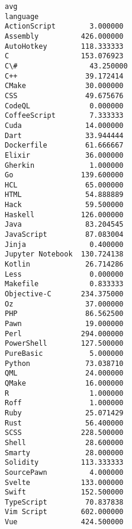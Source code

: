 \documentclass[11pt]{article}
\makeatletter
\newcommand{\boxspacing}{\kern\kvtcb@left@rule\kern\kvtcb@boxsep}
\newcommand{\prompt}[4]{
        {\ttfamily\llap{{\color{#2}[#3]:\hspace{3pt}#4}}\vspace{-\baselineskip}}
    }
\makeatother
\begin{document}
            \begin{tcolorbox}[breakable, size=fbox, boxrule=.5pt, pad at break*=1mm, opacityfill=0]
\prompt{Out}{outcolor}{13}{\boxspacing}
\begin{Verbatim}[commandchars=\\\{\}]
                         avg
language
ActionScript        3.000000
Assembly          426.000000
AutoHotkey        118.333333
C                 153.076923
C\#                 43.250000
C++                39.172414
CMake              30.000000
CSS                49.675676
CodeQL              0.000000
CoffeeScript        7.333333
Cuda               14.000000
Dart               33.944444
Dockerfile         61.666667
Elixir             36.000000
Gherkin             1.000000
Go                139.600000
HCL                65.000000
HTML               54.888889
Hack               59.500000
Haskell           126.000000
Java               83.204545
JavaScript         87.083004
Jinja               0.400000
Jupyter Notebook  130.724138
Kotlin             26.714286
Less                0.000000
Makefile            0.833333
Objective-C       234.375000
Oz                 37.000000
PHP                86.562500
Pawn               19.000000
Perl              294.000000
PowerShell        127.500000
PureBasic           5.000000
Python             73.038710
QML                24.000000
QMake              16.000000
R                   1.000000
Roff                1.000000
Ruby               25.071429
Rust               56.400000
SCSS              228.500000
Shell              28.600000
Smarty             28.000000
Solidity          113.333333
SourcePawn          4.000000
Svelte            133.000000
Swift             152.500000
TypeScript         70.837838
Vim Script        602.000000
Vue               424.500000
\end{Verbatim}
\end{tcolorbox}
        
\end{document}
